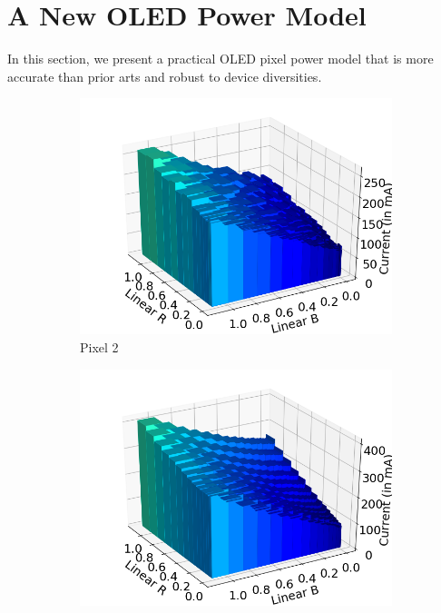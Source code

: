 \section{A New OLED Power Model}
\label{sec:newmodel}

In this section, we present a practical OLED pixel power model that
is more accurate than prior arts and robust to device diversities.

\begin{figure}[tp]
	\hfill
	\begin{subfigure}[]{0.28\textwidth}
		\includegraphics[width=\textwidth]{figure/002_Pixel2_monotonicity_cube.png}
		\caption{Pixel 2}
		\label{fig:initial_monotonicity_n6_w}
	\end{subfigure}
	\hfill
	\begin{subfigure}[]{0.28\textwidth}
		\includegraphics[width=\textwidth]{figure/003_MotoZ3_monotonicity_cube.png}

\end{subfigure}
\end{figure}
